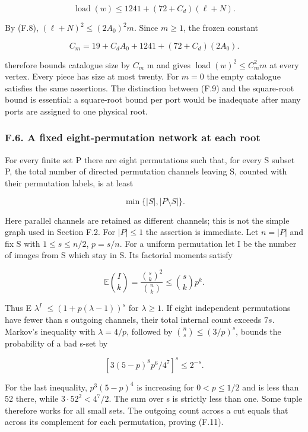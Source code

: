 \documentclass[english,11pt,a4paper]{article}
\begin{document}
\[\operatorname{load}(w)\le1241+(72+C_d)(\ell+N).\]

By (F.8), \((\ell+N)^2\le(2A_0)^2m\). Since \(m\ge 1\), the frozen constant

\[C_m=19+C_dA_0+1241+(72+C_d)(2A_0).\tag{F.10}\]

therefore bounds catalogue size by \(C_{m}\) m and gives \(\operatorname{load}(w)^2\le C_m^2m\) at every vertex. Every piece has size at most twenty. For \(m=0\) the empty catalogue satisfies the same assertions. The distinction between (F.9) and the square-root bound is essential: a square-root bound per port would be inadequate after many ports are assigned to one physical root.

\subsubsection{F.6. A fixed eight-permutation network at each root}\label{f.6.-a-fixed-eight-permutation-network-at-each-root}

For every finite set P there are eight permutations such that, for every S subset P, the total number of directed permutation channels leaving S, counted with their permutation labels, is at least

\[\min\{|S|,|P\setminus S|\}.\tag{F.11}\]

Here parallel channels are retained as different channels; this is not the simple graph used in Section F.2. For \(|P|\le 1\) the assertion is immediate. Let \(n=|P|\) and fix S with \(1\le s\le n/2\), \(p=s/n\). For a uniform permutation let I be the number of images from S which stay in S. Its factorial moments satisfy

\[\mathbb E\binom Ik=\frac{\binom sk^2}{\binom nk}\le\binom skp^k.\]

Thus E \(\lambda^{I}\) \(\le (1+p(\lambda-1))^{s}\) for \(\lambda\ge 1\). If eight independent permutations have fewer than s outgoing channels, their total internal count exceeds \(7s\). Markov's inequality with \(\lambda=4/p\), followed by \(\binom{n}{s}\le (3/p)^{s}\), bounds the probability of a bad s-set by

\[\left[3(5-p)^8p^6/4^7\right]^s\le2^{-s}.\]

For the last inequality, \(p^{3}(5-p)^{4}\) is increasing for \(0<p\le 1/2\) and is less than 52 there, while \(3\cdot 52^{2}<4^{7}/2\). The sum over s is strictly less than one. Some tuple therefore works for all small sets. The outgoing count across a cut equals that across its complement for each permutation, proving (F.11).
\end{document}
